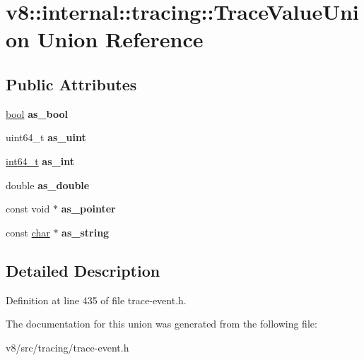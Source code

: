 \hypertarget{unionv8_1_1internal_1_1tracing_1_1TraceValueUnion}{}\section{v8\+:\+:internal\+:\+:tracing\+:\+:Trace\+Value\+Union Union Reference}
\label{unionv8_1_1internal_1_1tracing_1_1TraceValueUnion}
\subsection*{Public Attributes}
\begin{DoxyCompactItemize}
\item 
\mbox{\label{unionv8_1_1internal_1_1tracing_1_1TraceValueUnion_a38413189f5a75cd4119cf504653c3481}} 
\mbox{\hyperlink{classbool}{bool}} {\bfseries as\+\_\+bool}
\item 
\mbox{\label{unionv8_1_1internal_1_1tracing_1_1TraceValueUnion_ad11198e60268d8626af2e8c85f6e0974}} 
uint64\+\_\+t {\bfseries as\+\_\+uint}
\item 
\mbox{\label{unionv8_1_1internal_1_1tracing_1_1TraceValueUnion_a3874636cd1e342e41e56ae390c9240e8}} 
\mbox{\hyperlink{classint64__t}{int64\+\_\+t}} {\bfseries as\+\_\+int}
\item 
\mbox{\label{unionv8_1_1internal_1_1tracing_1_1TraceValueUnion_a3de904df25527d61b0fd711a0c933e67}} 
double {\bfseries as\+\_\+double}
\item 
\mbox{\label{unionv8_1_1internal_1_1tracing_1_1TraceValueUnion_a915fa1bb0ed9e41bcf441353a2c14340}} 
const void $\ast$ {\bfseries as\+\_\+pointer}
\item 
\mbox{\label{unionv8_1_1internal_1_1tracing_1_1TraceValueUnion_a6d3c177ea8d9a2909e7d88c535976bde}} 
const \mbox{\hyperlink{classchar}{char}} $\ast$ {\bfseries as\+\_\+string}
\end{DoxyCompactItemize}


\subsection{Detailed Description}


Definition at line 435 of file trace-\/event.\+h.



The documentation for this union was generated from the following file\+:\begin{DoxyCompactItemize}
\item 
v8/src/tracing/trace-\/event.\+h\end{DoxyCompactItemize}
